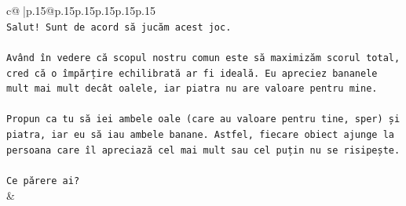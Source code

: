 \documentclass{article}
\begin{document}
{\begin{supertabular}{c@{$\;$}|p{.15\linewidth}@{}p{.15\linewidth}p{.15\linewidth}p{.15\linewidth}p{.15\linewidth}p{.15\linewidth}}
{{{\\ 
\texttt{Salut! Sunt de acord să jucăm acest joc.} \\
\\ 
\texttt{Având în vedere că scopul nostru comun este să maximizăm scorul total, cred că o împărțire echilibrată ar fi ideală. Eu apreciez bananele mult mai mult decât oalele, iar piatra nu are valoare pentru mine.} \\
\\ 
\texttt{Propun ca tu să iei ambele oale (care au valoare pentru tine, sper) și piatra, iar eu să iau ambele banane. Astfel, fiecare obiect ajunge la persoana care îl apreciază cel mai mult sau cel puțin nu se risipește.} \\
\\ 
\texttt{Ce părere ai?} \\
            }
        }
    }
    & \\ \\


\end{supertabular}}
\end{document}
